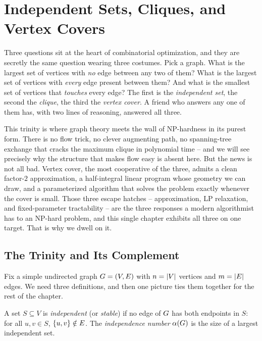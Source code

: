 \chapter{Independent Sets, Cliques, and Vertex Covers}

Three questions sit at the heart of combinatorial optimization, and they are
secretly the same question wearing three costumes. Pick a graph. What is the
largest set of vertices with \emph{no} edge between any two of them? What is the
largest set of vertices with \emph{every} edge present between them? And what is
the smallest set of vertices that \emph{touches} every edge? The first is the
\emph{independent set}, the second the \emph{clique}, the third the \emph{vertex
cover}. A friend who answers any one of them has, with two lines of reasoning,
answered all three.

This trinity is where graph theory meets the wall of NP-hardness in its purest
form. There is no flow trick, no clever augmenting path, no spanning-tree
exchange that cracks the maximum clique in polynomial time -- and we will see
precisely why the structure that makes flow easy is absent here. But the news is
not all bad. Vertex cover, the most cooperative of the three, admits a clean
factor-$2$ approximation, a half-integral linear program whose geometry we can
draw, and a parameterized algorithm that solves the problem exactly whenever the
cover is small. Those three escape hatches -- approximation, LP relaxation, and
fixed-parameter tractability -- are the three responses a modern algorithmist
has to an NP-hard problem, and this single chapter exhibits all three on one
target. That is why we dwell on it.

\chapterline

\section{The Trinity and Its Complement}
\label{ch29:trinity}

Fix a simple undirected graph $G=(V,E)$ with $n=\lvert V\rvert$ vertices and
$m=\lvert E\rvert$ edges. We need three definitions, and then one picture ties them
together for the rest of the chapter.

\begin{definition}
\label{ch29:def-is}
A set $S\subseteq V$ is \emph{independent} (or \emph{stable}) if no edge of
$G$ has both endpoints in $S$: for all $u,v\in S$, $\{u,v\}\notin E$. The
\emph{independence number} $\alpha(G)$ is the size of a largest independent
set.
\end{definition}

